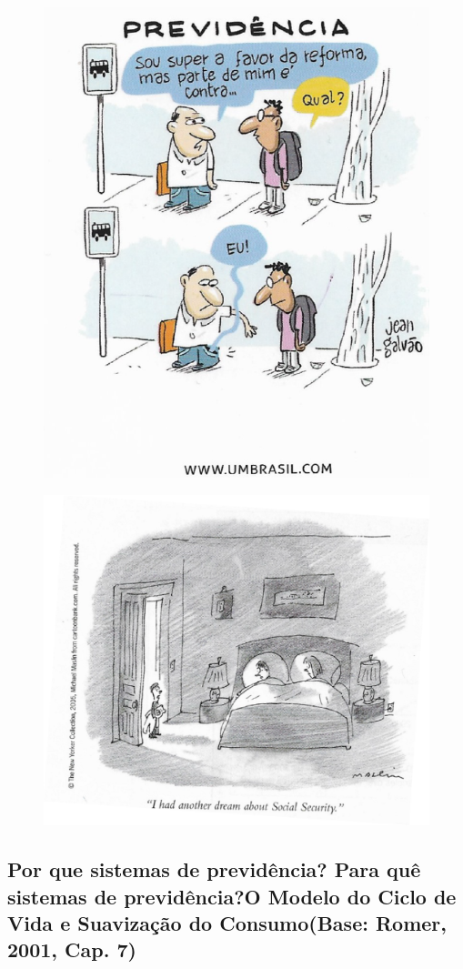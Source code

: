 \documentclass[a4paper,12pt]{article}[abntex2]
\begin{document}
\begin{figure}[H]
    \centering
    \includegraphics[width=0.7\linewidth]{Imagens/a16i1.png}
\end{figure}

\begin{figure}[H]
    \centering
    \includegraphics[width=0.7\linewidth]{Imagens/a16i2.png}
\end{figure}

\subsection{\textbf{Por que sistemas de previdência? Para quê sistemas de previdência?O Modelo do Ciclo de Vida e Suavização do Consumo(Base: Romer, 2001, Cap. 7)}}
\end{document}
